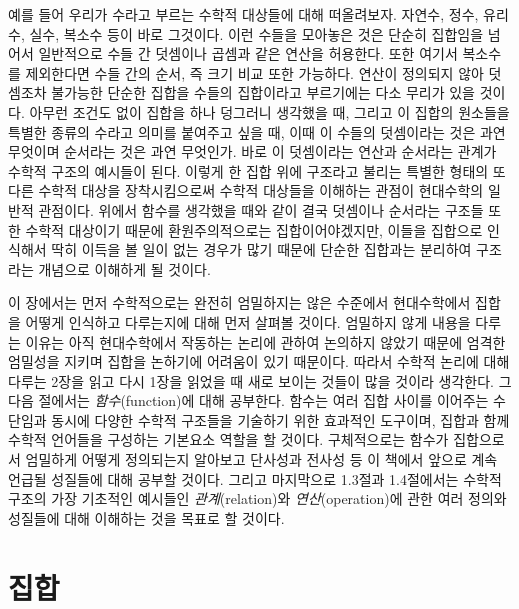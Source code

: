 \documentclass{../../large}
\begin{document}
예를 들어 우리가 수라고 부르는 수학적 대상들에 대해 떠올려보자.
자연수, 정수, 유리수, 실수, 복소수 등이 바로 그것이다.
이런 수들을 모아놓은 것은 단순히 집합임을 넘어서 일반적으로 수들 간 덧셈이나 곱셈과 같은 연산을 허용한다.
또한 여기서 복소수를 제외한다면 수들 간의 순서, 즉 크기 비교 또한 가능하다.
연산이 정의되지 않아 덧셈조차 불가능한 단순한 집합을 수들의 집합이라고 부르기에는 다소 무리가 있을 것이다.
아무런 조건도 없이 집합을 하나 덩그러니 생각했을 때, 그리고 이 집합의 원소들을 특별한 종류의 수라고 의미를 붙여주고 싶을 때, 이때 이 수들의 덧셈이라는 것은 과연 무엇이며 순서라는 것은 과연 무엇인가.
바로 이 덧셈이라는 연산과 순서라는 관계가 수학적 구조의 예시들이 된다.
이렇게 한 집합 위에 구조라고 불리는 특별한 형태의 또다른 수학적 대상을 장착시킴으로써 수학적 대상들을 이해하는 관점이 현대수학의 일반적 관점이다.
위에서 함수를 생각했을 때와 같이 결국 덧셈이나 순서라는 구조들 또한 수학적 대상이기 때문에 환원주의적으로는 집합이어야겠지만, 이들을 집합으로 인식해서 딱히 이득을 볼 일이 없는 경우가 많기 때문에 단순한 집합과는 분리하여 구조라는 개념으로 이해하게 될 것이다.

이 장에서는 먼저 수학적으로는 완전히 엄밀하지는 않은 수준에서 현대수학에서 집합을 어떻게 인식하고 다루는지에 대해 먼저 살펴볼 것이다.
엄밀하지 않게 내용을 다루는 이유는 아직 현대수학에서 작동하는 논리에 관하여 논의하지 않았기 때문에 엄격한 엄밀성을 지키며 집합을 논하기에 어려움이 있기 때문이다.
따라서 수학적 논리에 대해 다루는 2장을 읽고 다시 1장을 읽었을 때 새로 보이는 것들이 많을 것이라 생각한다.
그 다음 절에서는 \emph{함수}(function)에 대해 공부한다.
함수는 여러 집합 사이를 이어주는 수단임과 동시에 다양한 수학적 구조들을 기술하기 위한 효과적인 도구이며, 집합과 함께 수학적 언어들을 구성하는 기본요소 역할을 할 것이다.
구체적으로는 함수가 집합으로서 엄밀하게 어떻게 정의되는지 알아보고 단사성과 전사성 등 이 책에서 앞으로 계속 언급될 성질들에 대해 공부할 것이다.
그리고 마지막으로 1.3절과 1.4절에서는 수학적 구조의 가장 기초적인 예시들인 \emph{관계}(relation)와 \emph{연산}(operation)에 관한 여러 정의와 성질들에 대해 이해하는 것을 목표로 할 것이다.

\section{집합}
\end{document}

